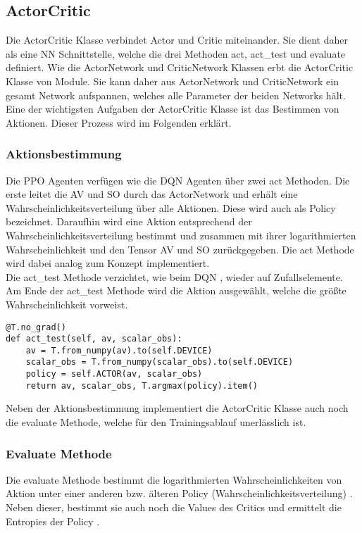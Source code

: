 \subsection{ActorCritic} \label{subsec:Implementierung_ActorCritic}
Die ActorCritic Klasse verbindet Actor und Critic miteinander. Sie dient daher als eine NN Schnittstelle, welche die drei Methoden act, act\_test und  evaluate definiert.
Wie die ActorNetwork und CriticNetwork Klassen erbt die ActorCritic Klasse von Module. Sie kann daher aus ActorNetwork und CriticNetwork ein gesamt Network aufspannen, welches alle Parameter der beiden Networks hält. Eine der wichtigsten Aufgaben der ActorCritic Klasse ist das Bestimmen von Aktionen. Dieser Prozess wird im Folgenden erklärt.

\subsubsection{Aktionsbestimmung} \label{subsubsec:Implementierung_Aktionsbestimmung_PPO}
Die PPO Agenten verfügen wie die DQN Agenten über zwei act Methoden. Die erste leitet die AV und SO durch das ActorNetwork und erhält eine Wahrscheinlichkeitsverteilung über alle Aktionen. Diese wird auch als Policy bezeichnet.
Daraufhin wird eine Aktion entsprechend der Wahrscheinlichkeitsverteilung bestimmt und zusammen mit ihrer logarithmierten Wahrscheinlichkeit und den Tensor AV und SO zurückgegeben.
Die act Methode wird dabei analog zum Konzept  implementiert.\\
Die act\_test Methode verzichtet, wie beim DQN , wieder auf Zufallselemente.
Am Ende der act\_test Methode  wird die Aktion ausgewählt, welche die größte Wahrscheinlichkeit vorweist.

\begin{lstlisting}[caption=Darstellung der act\_test Methode, label=code:act_test_Methode, style=Python]
@T.no_grad()
def act_test(self, av, scalar_obs):
	av = T.from_numpy(av).to(self.DEVICE)
	scalar_obs = T.from_numpy(scalar_obs).to(self.DEVICE)
	policy = self.ACTOR(av, scalar_obs)
	return av, scalar_obs, T.argmax(policy).item()
\end{lstlisting}
Neben der Aktionsbestimmung implementiert die ActorCritic Klasse auch noch die evaluate Methode, welche für den Trainingsablauf unerlässlich ist.

\subsubsection{Evaluate Methode} \label{subsubsec:Implementierung_Evaluate}
Die evaluate Methode bestimmt die logarithmierten Wahrscheinlichkeiten von Aktion unter einer anderen bzw. älteren Policy (Wahrscheinlichkeitsverteilung) . 
Neben dieser, bestimmt sie auch noch die Values des Critics und ermittelt die Entropies der Policy .

